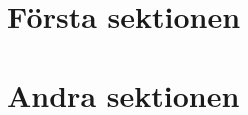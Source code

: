  \section{Första sektionen}\label{sek:exempel2}
  
  \section{Andra sektionen}\label{sek:exempel2}
  
